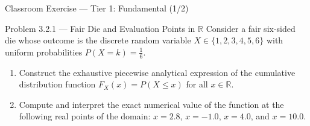 \documentclass[aspectratio=169,xcolor={dvipsnames,table}]{beamer}
\begin{document}
\begin{frame}{Classroom Exercise --- Tier 1: Fundamental (1/2)}
	\begin{block}{Problem 3.2.1 --- Fair Die and Evaluation Points in $\mathbb{R}$}
		\small
		Consider a fair six-sided die whose outcome is the discrete random variable $X \in \{1, 2, 3, 4, 5, 6\}$ with uniform probabilities $P(X=k) = \frac{1}{6}$.
		\begin{enumerate}\itemsep=0.15cm
			\item Construct the exhaustive piecewise analytical expression of the cumulative distribution function $F_X(x) = P(X \le x)$ for all $x \in \mathbb{R}$.
			\item Compute and interpret the exact numerical value of the function at the following real points of the domain: $x = 2.8$, $x = -1.0$, $x = 4.0$, and $x = 10.0$.
		\end{enumerate}
	\end{block}
\end{frame}
\end{document}
